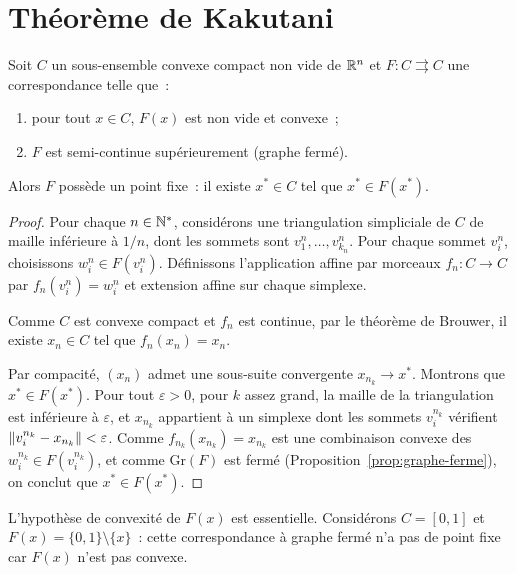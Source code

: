 \section{Th\'eor\`eme de Kakutani}

\begin{theoreme}[Kakutani, 1941]
\label{thm:kakutani}
Soit $C$ un sous-ensemble convexe compact non vide de $\mathbb{R}^n$ et
$F\colon C \rightrightarrows C$ une correspondance telle que~:
\begin{enumerate}
  \item pour tout $x \in C$, $F(x)$ est non vide et convexe~;
  \item $F$ est semi-continue sup\'erieurement (graphe ferm\'e).
\end{enumerate}
Alors $F$ poss\`ede un point fixe~: il existe $x^* \in C$ tel que $x^* \in F(x^*)$.
\end{theoreme}

\begin{proof}
Pour chaque $n \in \mathbb{N}^*$, consid\'erons une triangulation simpliciale de $C$ de maille
inf\'erieure \`a $1/n$, dont les sommets sont $v_1^n, \ldots, v_{k_n}^n$. Pour chaque
sommet $v_i^n$, choisissons $w_i^n \in F(v_i^n)$. D\'efinissons l'application affine par
morceaux $f_n\colon C \to C$ par $f_n(v_i^n) = w_i^n$ et extension affine sur chaque
simplexe.

Comme $C$ est convexe compact et $f_n$ est continue, par le th\'eor\`eme de Brouwer, il
existe $x_n \in C$ tel que $f_n(x_n) = x_n$.

Par compacit\'e, $(x_n)$ admet une sous-suite convergente $x_{n_k} \to x^*$. Montrons
que $x^* \in F(x^*)$. Pour tout $\varepsilon > 0$, pour $k$ assez grand, la maille de la
triangulation est inf\'erieure \`a $\varepsilon$, et $x_{n_k}$ appartient \`a un simplexe
dont les sommets $v_i^{n_k}$ v\'erifient $\left\| v_i^{n_k} - x_{n_k} \right\| < \varepsilon$. Comme
$f_{n_k}(x_{n_k}) = x_{n_k}$ est une combinaison convexe des $w_i^{n_k} \in F(v_i^{n_k})$,
et comme $\mathrm{Gr}(F)$ est ferm\'e (Proposition~\ref{prop:graphe-ferme}), on conclut
que $x^* \in F(x^*)$.
\end{proof}

\begin{attention}
L'hypoth\`ese de convexit\'e de $F(x)$ est essentielle. Consid\'erons $C = [0,1]$ et
$F(x) = \{0, 1\} \setminus \{x\}$~: cette correspondance \`a graphe ferm\'e n'a pas de
point fixe car $F(x)$ n'est pas convexe.
\end{attention}

